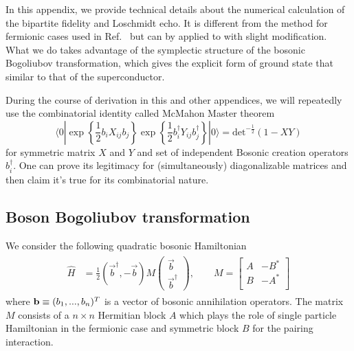 
In this appendix, we provide technical details about the numerical calculation of the bipartite fidelity and Loschmidt echo. It is different from the method for fermionic cases used in Ref.~ but can by applied to with slight modification. What we do takes advantage of the symplectic structure of the bosonic Bogoliubov transformation, which gives the explicit form of ground state that similar to that of the superconductor. 

During the course of derivation in this and other appendices, we will repeatedly use the combinatorial identity called McMahon Master theorem
\begin{equation}
\label{eq:bosonic_McMahon}
\langle0|\exp\left\{\frac{1}{2}b_iX_{ij}b_j\right\}\exp\left\{\frac{1}{2}b^\dagger_iY_{ij}b^\dagger_j\right\}|0\rangle=\text{det}^{-\frac{1}{2}}(1-XY)
\end{equation}
for symmetric matrix $X$ and $Y$ and set of independent Bosonic creation operators $b_i^{\dagger}$. One can prove its legitimacy for (simultaneously) diagonalizable matrices and then claim it's true for its combinatorial nature. 

\subsection{Boson Bogoliubov transformation}
\label{app_sub:boson_BdG}
We consider the following quadratic bosonic Hamiltonian
\begin{eqnarray}\begin{aligned}
\label{eq:quadratic_boson_H}
\hat{H}
&=
\frac{1}{2} (\vec{b}^{\dagger}, -\vec{b})
M 
\begin{pmatrix}
\vec{b}\\
\vec{b}^{\dagger} 
\end{pmatrix},  \qquad 
M = 
\begin{bmatrix}
A & -B^* \\
B & -A^* \\
\end{bmatrix}
\end{aligned}\end{eqnarray}
where ${\bf b}\equiv(b_{1},...,b_{n})^T$ is a vector of bosonic annihilation operators. The matrix $M$ consists of a $n\times n$ Hermitian block $A$ which plays the role of single particle Hamiltonian in the fermionic case and symmetric block $B$ for the pairing interaction. 

